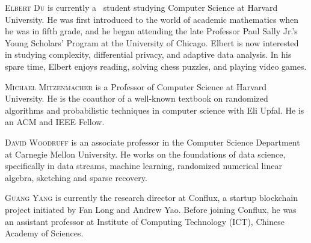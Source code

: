 \documentclass{toc}
\begin{document}
%
%
%
%
%
%
%
%
%
%
%
%
%
%
%
%
%
%
%
%
\begin{tocaboutauthors}
%
\begin{tocabout}[du]  %
  \textsc{Elbert Du} is currently a %
\phd\ student studying Computer Science at Harvard University. He was first introduced to the world of academic mathematics when he was in fifth grade, and he began attending the late Professor Paul Sally Jr.’s Young Scholars’ Program at the University of Chicago. Elbert is now interested in studying complexity, differential privacy, and adaptive data analysis. In his spare time, Elbert enjoys reading, solving chess puzzles, and playing video games.
\end{tocabout}
%
\begin{tocabout}[mitzenmacher]  %
  \textsc{Michael Mitzenmacher} is a Professor of Computer Science at Harvard University.  He is the %
coauthor  %
of a well-known textbook on randomized algorithms and probabilistic
techniques in computer science with Eli Upfal.  He is an ACM and IEEE Fellow.  
\end{tocabout}
%
\begin{tocabout}[woodruff]   %
\textsc{David Woodruff} is an associate
professor in the Computer Science Department at Carnegie Mellon University. He works on the foundations of data science, specifically in data streams, machine learning, randomized numerical linear algebra, sketching and sparse recovery. 
\end{tocabout}
%
\begin{tocabout}[yang]  %
\textsc{Guang Yang} is currently the research director at Conflux, a startup blockchain project initiated by Fan Long and Andrew Yao. Before joining Conflux, he was an assistant professor at Institute of Computing Technology (ICT), Chinese Academy of Sciences. 
\end{tocabout}
\end{tocaboutauthors}
\end{document}
